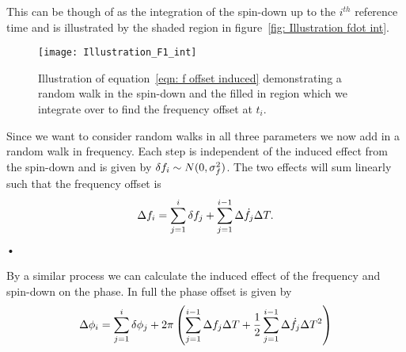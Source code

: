 This can be though of as the integration of the spin-down up to the $i^{th}$
reference time and is illustrated by the shaded region in figure~\ref{fig:
Illustration fdot int}. 

\begin{figure}[ht]
\centering
\texttt{[image: Illustration\_F1\_int]}
\caption{Illustration of equation~\eqref{eqn: f offset induced} demonstrating
a random walk in the spin-down and the filled in region which we
integrate over to find the frequency offset at $t_{i}$.}
\label{fig: Illustration fdot int}
\end{figure}

Since we want to consider random walks in all three parameters we now add in a
random walk in frequency. Each step is independent of the induced effect from
the spin-down and is given by \mbox{$\delta f_{i} \sim N(0, \sigma_{f}^{2})$}. The two
effects will sum linearly such that the frequency offset is
\begin{equation}
\Delta f_{i} = \sum_{j=1}^{i}\delta f_{j} + \sum_{j=1}^{i-1}\Delta\dot{f}_{j} \Delta T.
\label{eqn: f offset} 
\end{equation}•

By a similar process we can calculate the induced effect of the frequency and
spin-down on the phase. In full the phase offset is given by
\begin{equation}
\Delta\phi_{i}  =  \sum_{j=1}^{i}\delta \phi_{j} 
+ 2\pi\left(\sum_{j=1}^{i-1}\Delta f_{j}\Delta T 
+ \frac{1}{2}\sum_{j=1}^{i-1}\Delta \dot{f}_{j}\Delta T^{2}\right) \label{eqn: phi offset} 
\end{equation}



